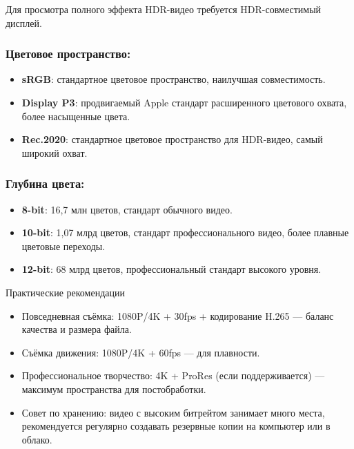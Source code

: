 Для просмотра полного эффекта HDR-видео требуется HDR-совместимый дисплей.


\subsubsection*{Цветовое пространство:}

\begin{itemize}
  \item \textbf{sRGB}: стандартное цветовое пространство, наилучшая совместимость.
  \item \textbf{Display P3}: продвигаемый Apple стандарт расширенного цветового охвата, более насыщенные цвета.
  \item \textbf{Rec.2020}: стандартное цветовое пространство для HDR-видео, самый широкий охват.
\end{itemize}

\subsubsection*{Глубина цвета:}

\begin{itemize}
  \item \textbf{8-bit}: 16,7 млн цветов, стандарт обычного видео.
  \item \textbf{10-bit}: 1,07 млрд цветов, стандарт профессионального видео, более плавные цветовые переходы.
  \item \textbf{12-bit}: 68 млрд цветов, профессиональный стандарт высокого уровня.
\end{itemize}

\begin{tcbinfo}{Практические рекомендации}
\begin{itemize}
  \item Повседневная съёмка: 1080P/4K + 30fps + кодирование H.265 — баланс качества и размера файла.
  \item Съёмка движения: 1080P/4K + 60fps — для плавности.
  \item Профессиональное творчество: 4K + ProRes (если поддерживается) — максимум пространства для постобработки.
  \item Совет по хранению: видео с высоким битрейтом занимает много места, рекомендуется регулярно создавать резервные копии на компьютер или в облако.
\end{itemize}

\end{tcbinfo}

